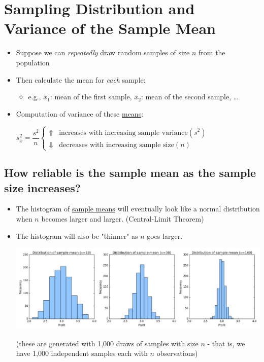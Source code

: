 \documentclass[10pt,article]{article}
\begin{document}
\section{Sampling Distribution and Variance of the Sample Mean}
\label{sec:org16bb649}
\begin{itemize}
\item Suppose we can \emph{repeatedly} draw random samples of size \(n\) from the population
\item Then calculate the mean for \emph{each} sample:

\begin{itemize}
\item e.g., \(\bar{x}_1\): mean of the first sample, \(\bar{x}_2\): mean of
the second sample, \ldots{}
\end{itemize}

\item Computation of variance of these \uline{means}:

\(s^2_{\bar{x}} = \dfrac{s^2}{n} \begin{cases} 
       \Uparrow &  \text{increases with increasing sample variance} (s^2) \\
       \Downarrow & \text{decreases with increasing sample size} (n)
       \end{cases}\)
\end{itemize}

\subsection{How reliable is the sample mean as the sample size increases?}
\label{sec:org95d97b7}
\begin{itemize}
\item The histogram of \uline{sample means} will eventually look like a normal
distribution when \(n\) becomes larger and larger. (Central-Limit Theorem)
\item The histogram will also be "thinner" as \(n\) goes larger.

\begin{center}
\includegraphics[width=13cm]{../../../Assets/Images/Statistics/hist_mean_n.png}
\end{center}

(these are generated with 1,000 draws of samples with size \(n\) - that
is, we have 1,000 independent samples each with \(n\) observations)
\end{itemize}
\end{document}

